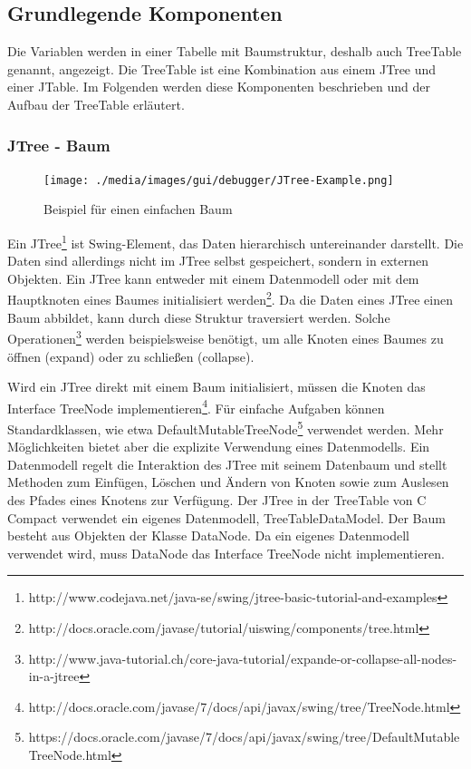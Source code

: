 
\subsection{Grundlegende Komponenten}
Die Variablen werden in einer Tabelle mit Baumstruktur, deshalb auch \glqq{}TreeTable\grqq{} genannt, angezeigt. Die TreeTable ist eine Kombination aus einem JTree und einer JTable.
Im Folgenden werden diese Komponenten beschrieben und der Aufbau der TreeTable erläutert.

\subsubsection*{JTree - Baum}

\begin{figure}
  	\begin{center}
    	\texttt{[image: ./media/images/gui/debugger/JTree-Example.png]}
  	\end{center}
  	\caption{Beispiel für einen einfachen Baum}
	\label{fig:deb-tt-example-jtree}
\end{figure}

Ein JTree\footnote{http://www.codejava.net/java-se/swing/jtree-basic-tutorial-and-examples} ist Swing-Element, das Daten hierarchisch untereinander darstellt. Die Daten sind allerdings nicht im JTree selbst gespeichert, sondern in externen Objekten. Ein JTree kann entweder mit einem Datenmodell oder mit dem Hauptknoten eines Baumes initialisiert werden\footnote{http://docs.oracle.com/javase/tutorial/uiswing/components/tree.html}. Da die Daten eines JTree einen Baum abbildet, kann durch diese Struktur traversiert werden. Solche Operationen\footnote{http://www.java-tutorial.ch/core-java-tutorial/expande-or-collapse-all-nodes-in-a-jtree} werden beispielsweise benötigt, um alle Knoten eines Baumes zu öffnen (expand) oder zu schließen (collapse).

Wird ein JTree direkt mit einem Baum initialisiert, müssen die Knoten das Interface TreeNode implementieren\footnote{http://docs.oracle.com/javase/7/docs/api/javax/swing/tree/TreeNode.html}. Für einfache Aufgaben können Standardklassen, wie etwa DefaultMutableTreeNode\footnote{https://docs.oracle.com/javase/7/docs/api/javax/swing/tree/DefaultMutableTreeNode.html} verwendet werden.
Mehr Möglichkeiten bietet aber die explizite Verwendung eines Datenmodells. Ein Datenmodell regelt die Interaktion des JTree mit seinem Datenbaum und stellt Methoden zum Einfügen, Löschen und Ändern von Knoten sowie zum Auslesen des Pfades eines Knotens zur Verfügung.
Der JTree in der TreeTable von C Compact verwendet ein eigenes Datenmodell, TreeTableDataModel. Der Baum besteht aus Objekten der Klasse DataNode. Da ein eigenes Datenmodell verwendet wird, muss DataNode das Interface TreeNode nicht implementieren.

